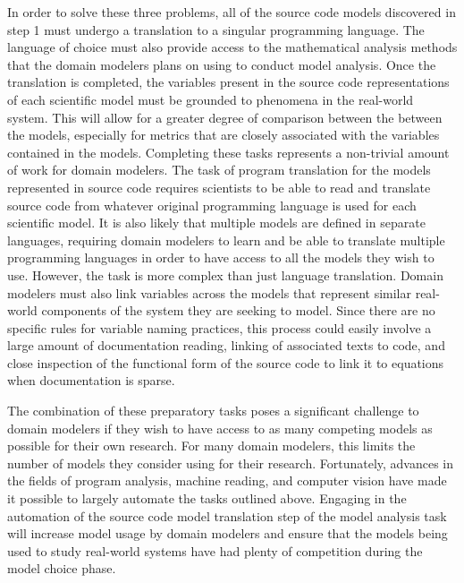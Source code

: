 In order to solve these three problems, all of the source code models discovered in step 1 must undergo a translation to a singular programming language.
The language of choice must also provide access to the mathematical analysis methods that the domain modelers plans on using to conduct model analysis.
Once the translation is completed, the variables present in the source code representations of each scientific model must be grounded to phenomena in the real-world system.
This will allow for a greater degree of comparison between the between the models, especially for metrics that are closely associated with the variables contained in the models.
Completing these tasks represents a non-trivial amount of work for domain modelers.
The task of program translation for the models represented in source code requires scientists to be able to read and translate source code from whatever original programming language is used for each scientific model.
It is also likely that multiple models are defined in separate languages, requiring domain modelers to learn and be able to translate multiple programming languages in order to have access to all the models they wish to use.
However, the task is more complex than just language translation.
Domain modelers must also link variables across the models that represent similar real-world components of the system they are seeking to model.
Since there are no specific rules for variable naming practices, this process could easily involve a large amount of documentation reading, linking of associated texts to code, and close inspection of the functional form of the source code to link it to equations when documentation is sparse.

The combination of these preparatory tasks poses a significant challenge to domain modelers if they wish to have access to as many competing models as possible for their own research.
For many domain modelers, this limits the number of models they consider using for their research.
Fortunately, advances in the fields of program analysis, machine reading, and computer vision have made it possible to largely automate the tasks outlined above.
Engaging in the automation of the source code model translation step of the model analysis task will increase model usage by domain modelers and ensure that the models being used to study real-world systems have had plenty of competition during the model choice phase.

